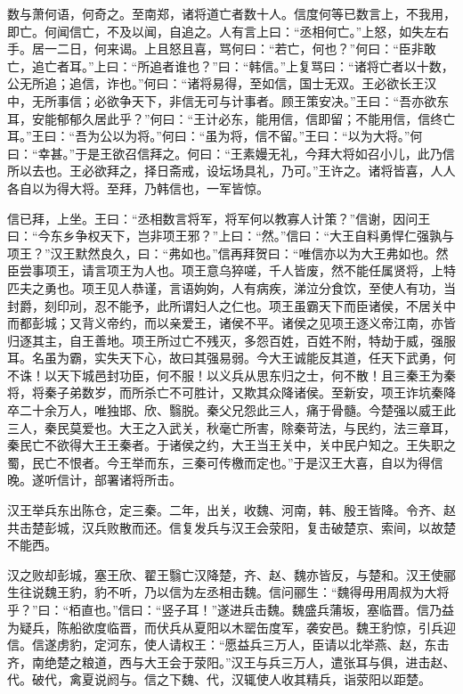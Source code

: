 \documentclass[]{article}
\begin{document}
数与萧何语，何奇之。至南郑，诸将道亡者数十人。信度何等已数言上，不我用，即亡。何闻信亡，不及以闻，自追之。人有言上曰：``丞相何亡。''上怒，如失左右手。居一二日，何来谒。上且怒且喜，骂何曰：``若亡，何也？''何曰：``臣非敢亡，追亡者耳。''上曰：``所追者谁也？''曰：``韩信。''上复骂曰：``诸将亡者以十数，公无所追；追信，诈也。''何曰：``诸将易得，至如信，国士无双。王必欲长王汉中，无所事信；必欲争天下，非信无可与计事者。顾王策安决。''王曰：``吾亦欲东耳，安能郁郁久居此乎？''何曰：``王计必东，能用信，信即留；不能用信，信终亡耳。''王曰：``吾为公以为将。''何曰：``虽为将，信不留。''王曰：``以为大将。''何曰：``幸甚。''于是王欲召信拜之。何曰：``王素嫚无礼，今拜大将如召小儿，此乃信所以去也。王必欲拜之，择日斋戒，设坛场具礼，乃可。''王许之。诸将皆喜，人人各自以为得大将。至拜，乃韩信也，一军皆惊。

信已拜，上坐。王曰：``丞相数言将军，将军何以教寡人计策？''信谢，因问王曰：``今东乡争权天下，岂非项王邪？''上曰：``然。''信曰：``大王自料勇悍仁强孰与项王？''汉王默然良久，曰：``弗如也。''信再拜贺曰：``唯信亦以为大王弗如也。然臣尝事项王，请言项王为人也。项王意乌猝嗟，千人皆废，然不能任属贤将，上特匹夫之勇也。项王见人恭谨，言语姁姁，人有病疾，涕泣分食饮，至使人有功，当封爵，刻印刓，忍不能予，此所谓妇人之仁也。项王虽霸天下而臣诸侯，不居关中而都彭城；又背义帝约，而以亲爱王，诸侯不平。诸侯之见项王逐义帝江南，亦皆归逐其主，自王善地。项王所过亡不残灭，多怨百姓，百姓不附，特劫于威，强服耳。名虽为霸，实失天下心，故曰其强易弱。今大王诚能反其道，任天下武勇，何不诛！以天下城邑封功臣，何不服！以义兵从思东归之士，何不散！且三秦王为秦将，将秦子弟数岁，而所杀亡不可胜计，又欺其众降诸侯。至新安，项王诈坑秦降卒二十余万人，唯独邯、欣、翳脱。秦父兄怨此三人，痛于骨髓。今楚强以威王此三人，秦民莫爱也。大王之入武关，秋毫亡所害，除秦苛法，与民约，法三章耳，秦民亡不欲得大王王秦者。于诸侯之约，大王当王关中，关中民户知之。王失职之蜀，民亡不恨者。今王举而东，三秦可传檄而定也。''于是汉王大喜，自以为得信晚。遂听信计，部署诸将所击。

汉王举兵东出陈仓，定三秦。二年，出关，收魏、河南，韩、殷王皆降。令齐、赵共击楚彭城，汉兵败散而还。信复发兵与汉王会荥阳，复击破楚京、索间，以故楚不能西。

汉之败却彭城，塞王欣、翟王翳亡汉降楚，齐、赵、魏亦皆反，与楚和。汉王使郦生往说魏王豹，豹不听，乃以信为左丞相击魏。信问郦生：``魏得毋用周叔为大将乎？''曰：``栢直也。''信曰：``竖子耳！''遂进兵击魏。魏盛兵蒲坂，塞临晋。信乃益为疑兵，陈船欲度临晋，而伏兵从夏阳以木罂缶度军，袭安邑。魏王豹惊，引兵迎信。信遂虏豹，定河东，使人请权王：``愿益兵三万人，臣请以北举燕、赵，东击齐，南绝楚之粮道，西与大王会于荥阳。''汉王与兵三万人，遣张耳与俱，进击赵、代。破代，禽夏说阏与。信之下魏、代，汉辄使人收其精兵，诣荥阳以距楚。
\end{document}
